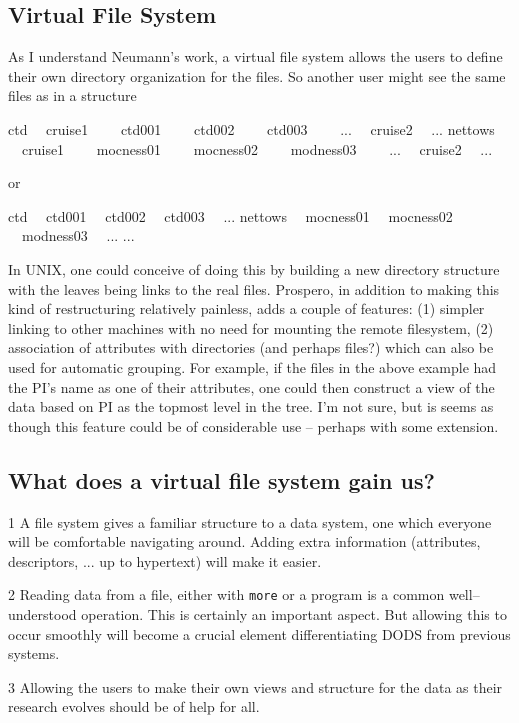 \subsection{Virtual File System}

As I understand Neumann's work, a virtual file system allows the users
to define their own directory organization for the files. So another
user might see the same files as in a structure


{\obeylines
ctd
~~cruise1
~~~~ctd001
~~~~ctd002
~~~~ctd003
~~~~...
~~cruise2
~~...
nettows
~~cruise1
~~~~mocness01
~~~~mocness02
~~~~modness03
~~~~...
~~cruise2
~~...
}

\ni or

{\obeylines
ctd
~~ctd001
~~ctd002
~~ctd003
~~...
nettows
~~mocness01
~~mocness02
~~modness03
~~...
...
}

\ni In UNIX, one could conceive of doing this by building a new
directory structure with the leaves being links to the real files.
Prospero, in addition to making this kind of restructuring relatively
painless, adds a couple of features: (1) simpler linking to other
machines with no need for mounting the remote filesystem, (2)
association of attributes with directories (and perhaps files?) which
can also be used for automatic grouping. For example, if the files in
the above example had the PI's name as one of their attributes, one
could then construct a view of the data based on PI as the topmost
level in the tree. I'm not sure, but is seems as though this feature
could be of considerable use -- perhaps with some extension.

\subsection{What does a virtual file system gain us?}

\item{1} A file system gives a familiar structure to a data system,
one which everyone will be comfortable navigating around. Adding extra
information (attributes, descriptors, ... up to hypertext) will make
it easier.
\item{2} Reading data from a file, either with {\tt more} or a program
is a common well--understood operation. This is certainly an important
aspect. But allowing this to occur smoothly will become a crucial
element differentiating DODS from previous systems.
\item{3} Allowing the users to make their own views and structure for
the data as their research evolves should be of help for all.

